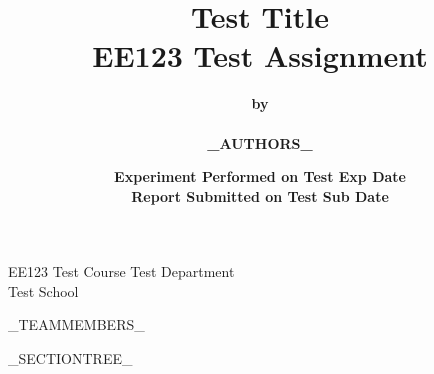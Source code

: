 \documentclass[letterpaper,12pt]{article}
\begin{document}
\title{\textbf{ Test Title \\
   \large EE123 \textendash Test Assignment}}
\author{\textbf{by}\\
   \hspace{0.1in}\\
   \textbf{ _AUTHORS_}}
\date{\textbf{Experiment Performed on Test Exp Date\\}
   \textbf{Report Submitted on Test Sub Date}}

\maketitle
{}
\thispagestyle{empty}
\begin{bfseries}
\begin{center}
EE123 \textendash Test Course
\bigskip
Test Department\\
Test School
\end{center}
\end{bfseries}
%
%
%
_TEAMMEMBERS_

\begin{abstract}
\end{abstract}

\newpage
{}
_SECTIONTREE_
\end{document}
